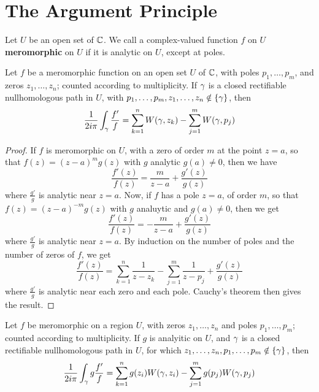 \section{The Argument Principle}

\begin{definition}
    Let $U$ be an open set of  $\mathbb{C}$. We call a complex-valued function $f$ on
    $U$ \textbf{meromorphic} on $U$ if it is analytic on $U$, except at poles.
\end{definition}

\begin{theorem}\label{5.3.1}
    Let $f$ be a meromorphic function on an open set  $U$ of  $\mathbb{C}$, with poles
    $p_1, \dots, p_m$, and zeros $z_1, \dots, z_n$; counted according to
    multiplicity. If $\gamma$ is a closed rectifiable nullhomologous path in  $U$,
    with $p_1, \dots, p_m,z_1, \dots, z_n \notin \{\gamma\}$, then
    \begin{equation*}
        \frac{1}{2i\pi}\int_\gamma{\frac{f'}{f}}=
        \sum_{k=1}^n{W(\gamma,z_k)}-\sum_{j=1}^m{W(\gamma,p_j)}
    \end{equation*}
\end{theorem}
\begin{proof}
    If $f$ is meromorphic on $U$, with a zero of order $m$ at the point  $z=a$,
    so that  $f(z)=(z-a)^mg(z)$ with $g$ analytic $g(a) \neq 0$, then we have
    \begin{equation*}
        \frac{f'(z)}{f(z)}=\frac{m}{z-a}+\frac{g'(z)}{g(z)}
    \end{equation*}
    where $\frac{g'}{g}$ is analytic near $z=a$. Now, if  $f$ has a pole  $z=a$,
    of order  $m$, so that $f(z)=(z-a)^{-m}g(z)$ with $g$ analuytic and $g(a)
    \neq 0$, then we get
    \begin{equation*}
        \frac{f'(z)}{f(z)}=-\frac{m}{z-a}+\frac{g'(z)}{g(z)}
    \end{equation*}
    where $\frac{g'}{g}$ is analytic near $z=a$. By induction on the number of
    poles and the number of zeros of $f$, we get
    \begin{equation*}
        \frac{f'(z)}{f(z)}=
        \sum_{k=1}^n{\frac{1}{z-z_k}}-\sum_{j=1}^m{\frac{1}{z-p_j}}+\frac{g'(z)}{g(z)}
    \end{equation*}
    where $\frac{g'}{g}$ is analytic near each zero and each pole. Cauchy's
    theorem then gives the result.
\end{proof}

\begin{theorem}\label{5.3.2}
    Let $f$ be meromorphic on a region  $U$, with  zeros $z_1, \dots, z_n$ and
    poles $p_1, \dots, p_m$; counted according to multiplicity. If $g$ is
    analyitic on  $U$, and  $\gamma$ is a closed rectifiable nullhomologous path in
     $U$, for which  $z_1, \dots,z_n, p_1, \dots, p_m \notin \{\gamma\}$, then
     \begin{equation*}
         \frac{1}{2i\pi}\int_\gamma{g\frac{f'}{f}}=
         \sum_{k=1}^n{g(z_i)W(\gamma,z_i)}-\sum_{j=1}^m{g(p_j)W(\gamma,p_j)}
     \end{equation*}
\end{theorem}

